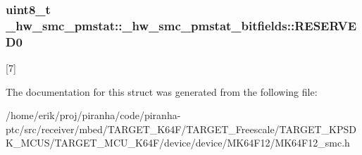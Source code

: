 \subsubsection[{\texorpdfstring{R\+E\+S\+E\+R\+V\+E\+D0}{RESERVED0}}]{\setlength{\rightskip}{0pt plus 5cm}uint8\+\_\+t \+\_\+hw\+\_\+smc\+\_\+pmstat\+::\+\_\+hw\+\_\+smc\+\_\+pmstat\+\_\+bitfields\+::\+R\+E\+S\+E\+R\+V\+E\+D0}\hypertarget{struct__hw__smc__pmstat_1_1__hw__smc__pmstat__bitfields_ab7f9053d8743c44274180856ac5508dd}{}\label{struct__hw__smc__pmstat_1_1__hw__smc__pmstat__bitfields_ab7f9053d8743c44274180856ac5508dd}
\mbox{[}7\mbox{]} 

The documentation for this struct was generated from the following file\+:\begin{DoxyCompactItemize}
\item 
/home/erik/proj/piranha/code/piranha-\/ptc/src/receiver/mbed/\+T\+A\+R\+G\+E\+T\+\_\+\+K64\+F/\+T\+A\+R\+G\+E\+T\+\_\+\+Freescale/\+T\+A\+R\+G\+E\+T\+\_\+\+K\+P\+S\+D\+K\+\_\+\+M\+C\+U\+S/\+T\+A\+R\+G\+E\+T\+\_\+\+M\+C\+U\+\_\+\+K64\+F/device/device/\+M\+K64\+F12/M\+K64\+F12\+\_\+smc.\+h\end{DoxyCompactItemize}
